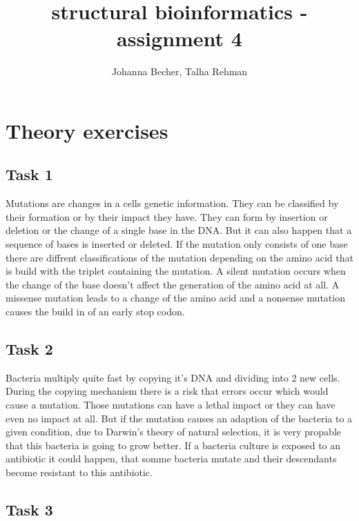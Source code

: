 \documentclass[]{article}
\title{structural bioinformatics - assignment 4}
\author{Johanna Becher, Talha Rehman}
\date{}
\begin{document}
\maketitle

\section{Theory exercises}
\subsection{Task 1}
Mutations are changes in a cells genetic information. They can be classified by their formation or by their impact they have. \newline
They can form by insertion or deletion or the change of a single base in the DNA. But it can also happen that a sequence of bases is inserted or deleted.\newline
If the mutation only consists of one base there are diffrent classifications of the mutation depending on the amino acid that is build with the triplet containing the mutation.\newline
A silent mutation occurs when the change of the base doesn't affect the generation of the amino acid at all. A missense mutation leads to a change of the amino acid and a nonsense mutation causes the build in of an early stop codon. \newline

\subsection{Task 2}
Bacteria multiply quite fast by copying it's DNA and dividing into 2 new cells. During the copying mechanism there is a risk that errors occur which would cause a mutation. \newline
Those mutations can have a lethal impact or they can have even no impact at all. But if the mutation causes an adaption of the bacteria to a given condition, due to Darwin's theory of natural selection, it is very propable that this bacteria is going to grow better.\newline
If a bacteria culture is exposed to an antibiotic it could happen, that somme bacteria mutate and their descendants become resistant to this antibiotic.

\subsection{Task 3}
\end{document}
